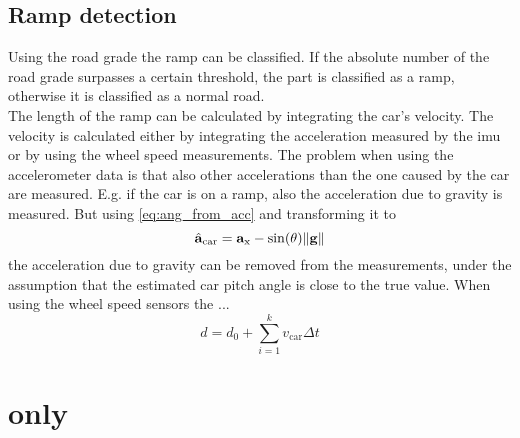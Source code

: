 \subsection{Ramp detection}
\label{ssec:ramp_detection_imu}
Using the road grade the ramp can be classified.
If the absolute number of the road grade surpasses a certain threshold, the part is classified as a ramp, otherwise it is classified as a normal road.\\
The length of the ramp can be calculated by integrating the car's velocity.
The velocity is calculated either by integrating the acceleration measured by the \gls{imu} or by using the wheel speed measurements.
The problem when using the accelerometer data is that also other accelerations than the one caused by the car are measured.
E.g. if the car is on a ramp, also the acceleration due to gravity is measured.
But using \cref{eq:ang_from_acc} and transforming it to
\begin{equation}
	\hat{\vb{a}}_\mathrm{car} = \vb{a}_\mathrm{x} - \sin(\theta) \norm{\vb{g}}
\end{equation}
the acceleration due to gravity can be removed from the measurements, under the assumption that the estimated car pitch angle is close to the true value.
When using the wheel speed sensors the ...
\begin{equation}
	d = d_0 + \sum_{i = 1}^k v_\mathrm{car} \Delta t
\end{equation}


\section{ only}
\label{sec:methods_lidar}
